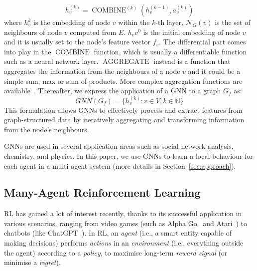 \documentclass[conference]{IEEEtran}
\begin{document}
\begin{equation}
h_{v}^{(k)}=\operatorname{COMBINE}^{(k)}\left(h_{v}^{(k-1)}, a_{v}^{(k)}\right)
\end{equation}
where $h_{v}^{k}$ is the embedding of node $v$ within the $k$-th layer, 
 $\mathcal{N}_G(v)$ is the set of neighbours of node $v$ computed from $E$.
%
$h_v{v}^0$ is the initial embedding of node $v$ and it is usually set to the node's feature vector $f_v$.
%
The differential part comes into play in the $\operatorname{COMBINE}$ function, 
 which is usually a differentiable function such as a neural network layer.
%
$\operatorname{AGGREGATE} $ instead is a function that aggregates the information from the neighbours of a node $v$
 and it could be a simple sum, max or sum of products. 
 More complex aggregation functions are available~\cite{pellegrini2020learning}.
%
Thereafter, we express the application of a \ac{GNN} to a graph $G_f$ as:
\begin{equation}
GNN(G_f) = \{h_v^{(k)}: v \in V, k \in \mathbb{N}\}
\end{equation} 
This formulation allows \acp{GNN} to effectively process and extract features from graph-structured data by iteratively aggregating and transforming information from the node's neighbours.

\acp{GNN} are used in several application areas such as social network analysis, chemistry, and physics.
 In this paper, we use \acp{GNN} to learn a local behaviour for each agent in a multi-agent system (more details in Section~\ref{sec:approach}).
\subsection{Many-Agent Reinforcement Learning}

 \Ac{RL} has gained a lot of interest recently, 
 thanks to its successful application in various scenarios, 
 ranging from video games (such as Alpha Go~\cite{Silver2016Go} and Atari~\cite{Atari2016DQN}) 
 to chatbots (like ChatGPT~\cite{ChatGPT2023}). 
% 
In \ac{RL}, an \emph{agent} (i.e., a smart entity capable of making decisions) 
 performs \emph{actions} in an \emph{environment} (i.e., everything outside the agent) according to a \emph{policy}, 
 to maximise long-term \emph{reward signal} (or minimise a \emph{regret}).
\end{document}
